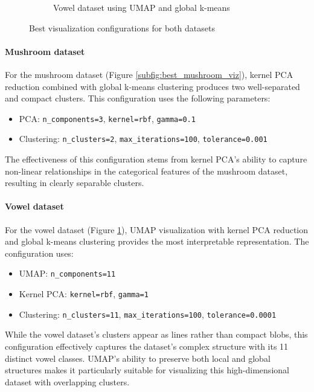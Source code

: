 \begin{figure}[h!]
\begin{subfigure}[b]{0.45\textwidth}
        \caption{Vowel dataset using UMAP and global k-means}
        \label{subfig:best_vowel_viz}
    \end{subfigure}
    
    \caption{Best visualization configurations for both datasets}
    \label{fig:best_visualizations}
\end{figure}

\paragraph{Mushroom dataset}
For the mushroom dataset (Figure \ref{subfig:best_mushroom_viz}), kernel PCA reduction combined with global k-means clustering produces two well-separated and compact clusters. This configuration uses the following parameters:
\begin{itemize}
    \item PCA: \texttt{n\_components=3}, \texttt{kernel=rbf}, \texttt{gamma=0.1}
    \item Clustering: \texttt{n\_clusters=2}, \texttt{max\_iterations=100}, \texttt{tolerance=0.001}
\end{itemize}

The effectiveness of this configuration stems from kernel PCA's ability to capture non-linear relationships in the categorical features of the mushroom dataset, resulting in clearly separable clusters.

\paragraph{Vowel dataset}
For the vowel dataset (Figure \ref{subfig:best_vowel_viz}), UMAP visualization with kernel PCA reduction and global k-means clustering provides the most interpretable representation. The configuration uses:
\begin{itemize}
    \item UMAP: \texttt{n\_components=11}
    \item Kernel PCA: \texttt{kernel=rbf}, \texttt{gamma=1}
    \item Clustering: \texttt{n\_clusters=11}, \texttt{max\_iterations=100}, \texttt{tolerance=0.0001}
\end{itemize}

While the vowel dataset's clusters appear as lines rather than compact blobs, this configuration effectively captures the dataset's complex structure with its 11 distinct vowel classes. UMAP's ability to preserve both local and global structures makes it particularly suitable for visualizing this high-dimensional dataset with overlapping clusters.
